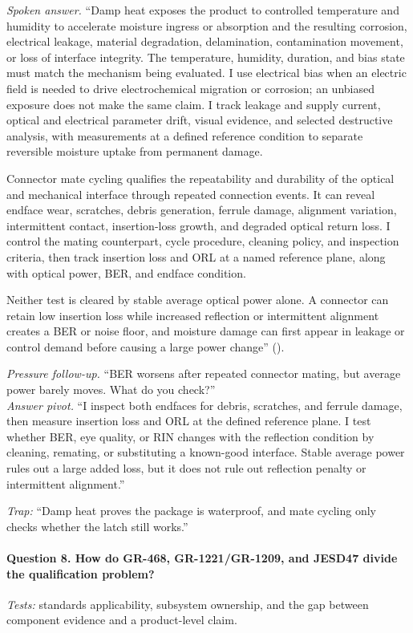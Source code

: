 \textit{Spoken answer.}
``Damp heat exposes the product to controlled temperature and humidity to
accelerate moisture ingress or absorption and the resulting corrosion,
electrical leakage, material degradation, delamination, contamination movement,
or loss of interface integrity. The temperature, humidity, duration, and bias
state must match the mechanism being evaluated. I use electrical bias when an
electric field is needed to drive electrochemical migration or corrosion; an
unbiased exposure does not make the same claim. I track leakage and supply
current, optical and electrical parameter drift, visual evidence, and selected
destructive analysis, with measurements at a defined reference condition to
separate reversible moisture uptake from permanent damage.

Connector mate cycling qualifies the repeatability and durability of the
optical and mechanical interface through repeated connection events. It can
reveal endface wear, scratches, debris generation, ferrule damage, alignment
variation, intermittent contact, insertion-loss growth, and degraded optical
return loss. I control the mating counterpart, cycle procedure, cleaning
policy, and inspection criteria, then track insertion loss and ORL at a named
reference plane, along with optical power, BER, and endface condition.

Neither test is cleared by stable average optical power alone. A connector can
retain low insertion loss while increased reflection or intermittent alignment
creates a BER or noise floor, and moisture damage can first appear in leakage or
control demand before causing a large power change''
().

\textit{Pressure follow-up.} ``BER worsens after repeated connector mating, but
average power barely moves. What do you check?''\\
\textit{Answer pivot.} ``I inspect both endfaces for debris, scratches, and
ferrule damage, then measure insertion loss and ORL at the defined reference
plane. I test whether BER, eye quality, or RIN changes with the reflection
condition by cleaning, remating, or substituting a known-good interface. Stable
average power rules out a large added loss, but it does not rule out reflection
penalty or intermittent alignment.''

\textit{Trap:} ``Damp heat proves the package is waterproof, and mate cycling
only checks whether the latch still works.''

\paragraph{Question 8. How do GR-468, GR-1221/GR-1209, and JESD47 divide the
qualification problem?}
\textit{Tests:} standards applicability, subsystem ownership, and the gap
between component evidence and a product-level claim.

